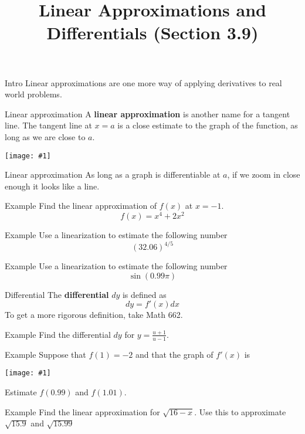 \documentclass[t]{beamer}
\title{Linear Approximations and Differentials (Section 3.9)}
\date{}
\newcommand{\img}[1]{
\vfill
\texttt{[image: \#1]}
\vfill
}
\begin{document}
\frame{\titlepage}

\begin{frame}{Intro}
Linear approximations are one more way of applying derivatives
to real world problems.  
\end{frame}

\begin{frame}{Linear approximation}
A \textbf{linear approximation} is another name for a tangent line. 
The tangent line at $x = a$ is a close estimate to the graph of the function,
as long as we are close to $a$.
\img{linapprox}
\end{frame}

\begin{frame}{Linear approximation}
As long as a graph is differentiable at $a$, if we zoom
in close enough it looks like a line.
\end{frame}

\begin{frame}{Example}
Find the linear approximation of $f(x)$ at $x = -1$.
$$f(x) = x^4 + 2x^2$$
\end{frame}

\begin{frame}{Example}
Use a linearization to estimate the following number
$$(32.06)^{4/5}$$
\end{frame}

\begin{frame}{Example}
Use a linearization to estimate the following number
$$\sin(0.99 \pi)$$
\end{frame}

\begin{frame}{Differential}
The \textbf{differential} $dy$ is defined as
$$dy = f'(x) dx$$
To get a more rigorous definition, take Math 662.
\end{frame}

\begin{frame}{Example}
Find the differential $dy$ for $\displaystyle y = \frac{u+1}{u-1}$.
\end{frame}

\begin{frame}{Example}
Suppose that $f(1) = -2$ and that the graph of $f'(x)$ is
\img{lla2}
Estimate $f(0.99)$ and $f(1.01)$.
\end{frame}

\begin{frame}{Example}
Find the linear approximation for $\sqrt{16-x}$. Use this to approximate
$\sqrt{15.9}$ and $\sqrt{15.99}$
\end{frame}
\end{document}
